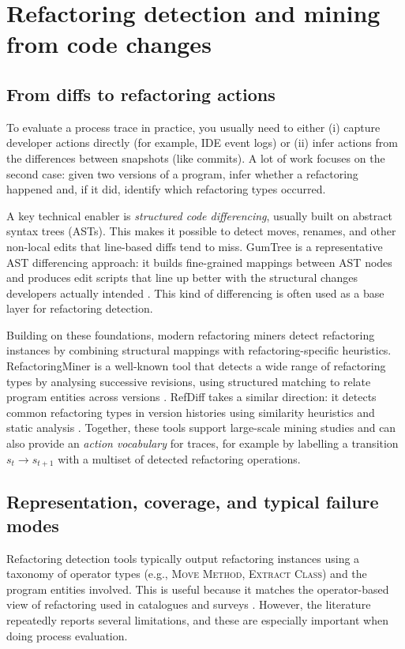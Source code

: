 \section{Refactoring detection and mining from code changes}
\label{sec:refactoring-mining}

\subsection{From diffs to refactoring actions}
To evaluate a process trace in practice, you usually need to either (i) capture developer actions directly (for example, IDE event logs) or (ii) infer actions from the differences between snapshots (like commits). A lot of work focuses on the second case: given two versions of a program, infer whether a refactoring happened and, if it did, identify which refactoring types occurred.

A key technical enabler is \emph{structured code differencing}, usually built on abstract syntax trees (ASTs). This makes it possible to detect moves, renames, and other non-local edits that line-based diffs tend to miss. GumTree is a representative AST differencing approach: it builds fine-grained mappings between AST nodes and produces edit scripts that line up better with the structural changes developers actually intended \cite{falleri2014gumtree}. This kind of differencing is often used as a base layer for refactoring detection.

Building on these foundations, modern refactoring miners detect refactoring instances by combining structural mappings with refactoring-specific heuristics. RefactoringMiner is a well-known tool that detects a wide range of refactoring types by analysing successive revisions, using structured matching to relate program entities across versions \cite{tsantalis2020refactoringminer}. RefDiff takes a similar direction: it detects common refactoring types in version histories using similarity heuristics and static analysis \cite{silva2017refdiff}. Together, these tools support large-scale mining studies and can also provide an \emph{action vocabulary} for traces, for example by labelling a transition $s_t \rightarrow s_{t+1}$ with a multiset of detected refactoring operations.

\subsection{Representation, coverage, and typical failure modes}
Refactoring detection tools typically output refactoring instances using a taxonomy of operator types (e.g., \textsc{Move Method}, \textsc{Extract Class}) and the program entities involved. This is useful because it matches the operator-based view of refactoring used in catalogues and surveys \cite{fowler1999refactoring,mens2004survey}. However, the literature repeatedly reports several limitations, and these are especially important when doing process evaluation.

